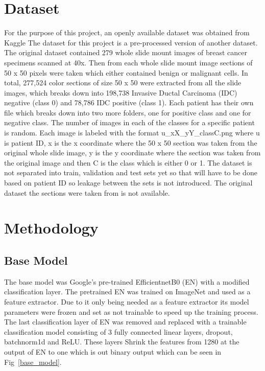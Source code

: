 \documentclass[conference]{IEEEtran}
\begin{document}
\section{Dataset}
For the purpose of this project, an openly available dataset was obtained from
Kaggle  The dataset for this project is a pre-processed version of another
dataset. The original dataset contained 279 whole slide mount images of breast
cancer specimens scanned at 40x. Then from each whole slide mount image
sections of 50 x 50 pixels were taken which either contained benign or
malignant cells. In total, 277,524 color sections of size 50 x 50 were
extracted from all the slide images, which breaks down into 198,738 Invasive
Ductal Carcinoma (IDC) negative (class 0) and 78,786 IDC positive (class 1).
Each patient has their own file which breaks down into two more folders, one
for positive class and one for negative class. The number of images in each
of the classes for a specific patient is random. Each image is labeled with
the format u\_xX\_yY\_classC.png where u is patient ID, x is the x coordinate
where the 50 x 50 section was taken from the original whole slide image, y
is the y coordinate where the section was taken from the original image and
then C is the class which is either 0 or 1. The dataset is not separated into
train, validation and test sets yet so that will have to be done based on
patient ID so leakage between the sets is not introduced. The original dataset
the sections were taken from is not available.

\section{Methodology}
\subsection{Base Model}
The base model was Google’s pre-trained EfficientnetB0 (EN) with a modified
classification layer. The pretrained EN was trained on ImageNet and used as a
feature extractor. Due to it only being needed as a feature extractor its model
parameters were frozen and set as not trainable to speed up the training
process. The last classification layer of EN was removed and replaced with a
trainable classification model consisting of 3 fully connected linear layers,
dropout, batchnorm1d and ReLU. These layers Shrink the features from 1280 at
the output of EN to one which is out binary output which can be seen in Fig~\ref{base_model}.
\end{document}
